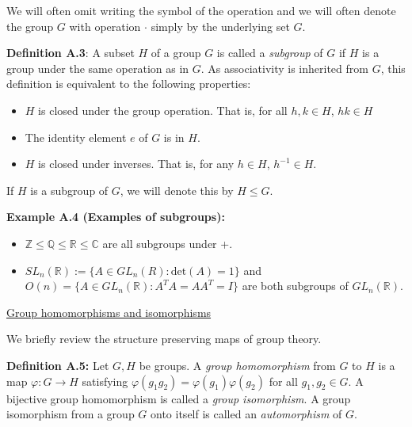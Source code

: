 \documentclass[12pt]{article}
\newcommand{\vs}{\vskip10pt}
\begin{document}
	\vs
	
	We will often omit writing the symbol of the operation and we will often denote the group $G$ with operation $\cdot$ simply by the underlying set $G$.
	
	\vs
	
	\textbf{Definition A.3}: A subset $H$ of a group $G$ is called a \textit{subgroup} of $G$ if $H$ is a group under the same operation as in $G$. As associativity is inherited from $G$, this definition is equivalent to the following properties: 
	
	\begin{itemize}
		\item $H$ is closed under the group operation. That is, for all $h,k \in H$, $hk \in H$
		\item The identity element $e$ of $G$ is in $H$.
		\item $H$ is closed under inverses. That is, for any $h \in H$, $h^{-1} \in H$. 
	\end{itemize}
	
	\vs 
	
	If $H$ is a subgroup of $G$, we will denote this by $H \leq G$.
	
	\vs 
	
	\textbf{Example A.4 (Examples of subgroups): } 
	
	\begin{itemize}
		\item $\mathbb{Z} \leq \mathbb{Q} \leq \mathbb{R} \leq \mathbb{C}$ are all subgroups under +.
		\item $SL_n(\mathbb{R}) := \{A \in GL_n(R) : \text{det}(A) = 1\}$ and $O(n) = \{A \in GL_n(\mathbb{R}) : A^T A = A A^T = I\}$ are both subgroups of $GL_n(\mathbb{R})$.
	\end{itemize}
	
	\vs 
	
	\underline{Group homomorphisms and isomorphisms}
	
	\vs
	
	We briefly review the structure preserving maps of group theory. 
	
	\vs
	
	\textbf{Definition A.5: } Let $G,H$ be groups. A \textit{group homomorphism} from $G$ to $H$ is a map $\varphi: G \rightarrow H$ satisfying $\varphi(g_1g_2) = \varphi(g_1)\varphi(g_2)$ for all $g_1, g_2 \in G$. A bijective group homomorphism is called a \textit{group isomorphism}. A group isomorphism from a group $G$ onto itself is called an \textit{automorphism} of $G$.
	
\end{document}
